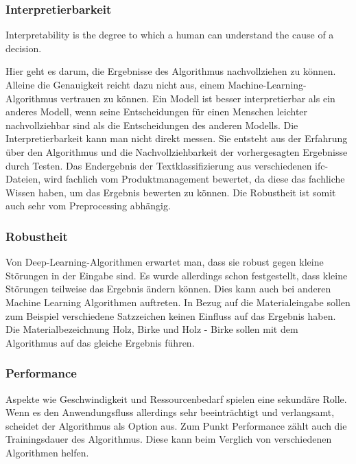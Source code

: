 \subsubsection{Interpretierbarkeit}
\begin{definition}[Interpretierbarkeit]
	\label{def:interpretability}
	\glqq Interpretability is the degree to which a human can understand the cause of a decision.\grqq{}\citep{miller_2017}
\end{definition}
Hier geht es darum, die Ergebnisse des Algorithmus nachvollziehen zu können. Alleine die Genauigkeit reicht dazu nicht aus, einem Machine-Learning-Algorithmus vertrauen zu können.
Ein Modell ist besser interpretierbar als ein anderes Modell, wenn seine Entscheidungen für einen Menschen leichter nachvollziehbar sind als die Entscheidungen des anderen Modells. Die Interpretierbarkeit kann man nicht direkt messen. Sie entsteht aus der Erfahrung über den Algorithmus und die Nachvollziehbarkeit der vorhergesagten Ergebnisse durch Testen.  \citep[vgl.][]{molnar2022} Das Endergebnis der Textklassifizierung aus verschiedenen \ac{ifc}-Dateien, wird fachlich vom Produktmanagement bewertet, da diese das fachliche Wissen haben, um das Ergebnis bewerten zu können. Die Robustheit ist somit auch sehr vom Preprocessing abhängig.

\subsubsection{Robustheit}

Von Deep-Learning-Algorithmen erwartet man, dass sie robust gegen kleine Störungen in der Eingabe sind. Es wurde allerdings schon festgestellt, dass kleine Störungen teilweise das Ergebnis ändern können. \citep[vgl.][]{Szegedy_2013} Dies kann auch bei anderen Machine Learning Algorithmen auftreten. In Bezug auf die Materialeingabe sollen zum Beispiel verschiedene Satzzeichen keinen Einfluss auf das Ergebnis haben. Die Materialbezeichnung \glqq Holz, Birke\grqq{} und \glqq Holz - Birke\grqq{} sollen mit dem Algorithmus auf das gleiche Ergebnis führen.

\subsubsection{Performance}

Aspekte wie Geschwindigkeit und Ressourcenbedarf spielen eine sekundäre Rolle. Wenn es den Anwendungsfluss allerdings sehr beeinträchtigt und verlangsamt, scheidet der Algorithmus als Option aus. Zum Punkt Performance zählt auch die Trainingsdauer des Algorithmus. Diese kann beim Verglich von verschiedenen Algorithmen helfen.\\

